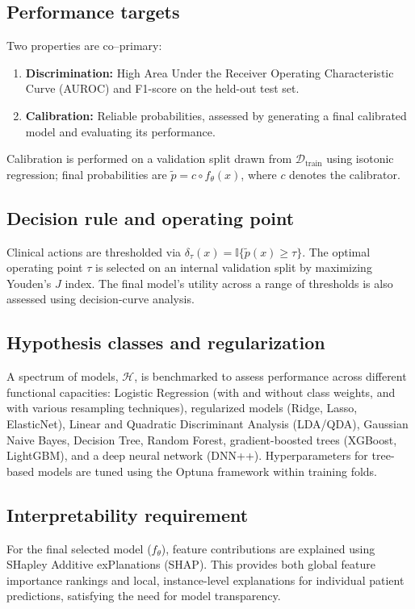\subsection{Performance targets}
Two properties are co–primary:
\begin{enumerate}[label=(\alph*)]
  \item \textbf{Discrimination:} High Area Under the Receiver Operating Characteristic Curve (AUROC) and F1-score on the held-out test set.
  \item \textbf{Calibration:} Reliable probabilities, assessed by generating a final calibrated model and evaluating its performance.
\end{enumerate}
Calibration is performed on a validation split drawn from $\mathcal{D}_{\mathrm{train}}$ using isotonic regression; final probabilities are $\tilde p=c\circ f_{\theta}(x)$, where $c$ denotes the calibrator.

\subsection{Decision rule and operating point}
Clinical actions are thresholded via $\delta_{\tau}(x)=\mathbb{I}\{\tilde p(x)\ge \tau\}$. The optimal operating point $\tau$ is selected on an internal validation split by maximizing Youden’s $J$ index. The final model's utility across a range of thresholds is also assessed using decision-curve analysis.

\subsection{Hypothesis classes and regularization}
A spectrum of models, $\mathcal{H}$, is benchmarked to assess performance across different functional capacities: Logistic Regression (with and without class weights, and with various resampling techniques), regularized models (Ridge, Lasso, ElasticNet), Linear and Quadratic Discriminant Analysis (LDA/QDA), Gaussian Naive Bayes, Decision Tree, Random Forest, gradient-boosted trees (XGBoost, LightGBM), and a deep neural network (DNN++). Hyperparameters for tree-based models are tuned using the Optuna framework within training folds.

\subsection{Interpretability requirement}
For the final selected model ($f_{\theta}$), feature contributions are explained using SHapley Additive exPlanations (SHAP). This provides both global feature importance rankings and local, instance-level explanations for individual patient predictions, satisfying the need for model transparency.

